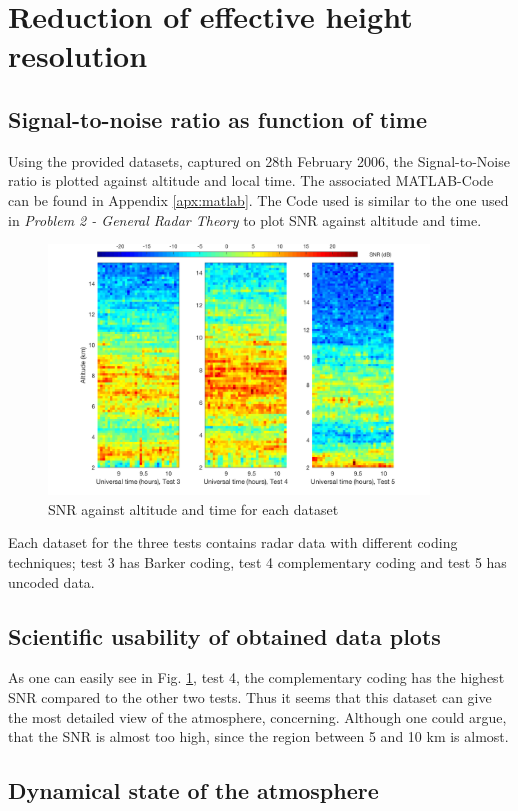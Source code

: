 \section{Reduction of effective height resolution}

\subsection{Signal-to-noise ratio as function of time}
Using the provided datasets, captured on 28th February 2006, the Signal-to-Noise ratio is plotted against altitude and local time. The associated MATLAB-Code can be found in Appendix \ref{apx:matlab}. The Code used is similar to the one used in \textit{Problem 2 - General Radar Theory} to plot SNR against altitude and time.

\begin{figure}
	\centering
	\includegraphics[width=0.9\textwidth]{images/task2_snr_plot}
	\caption{SNR against altitude and time for each dataset}
	\label{fig:snr}
\end{figure}

Each dataset for the three tests contains radar data with different coding techniques; test 3 has Barker coding, test 4 complementary coding and test 5 has uncoded data. \newline



\subsection{Scientific usability of obtained data plots}
As one can easily see in Fig. \ref{fig:snr}, test 4, the complementary coding has the highest SNR compared to the other two tests. Thus it seems that this dataset can give the most detailed view of the atmosphere, concerning.
Although one could argue, that the SNR is almost too high, since the region between 5 and 10 km is almost. 
\subsection{Dynamical state of the atmosphere}









